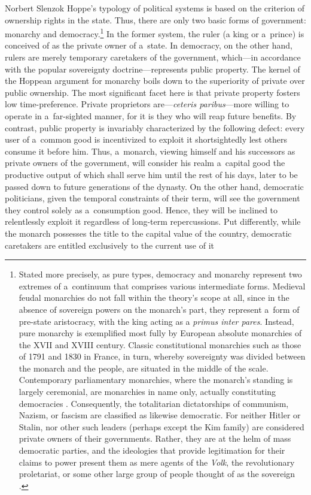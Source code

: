 \begin{artengenv}{Norbert Slenzok}
Hoppe's typology of political systems is based on the criterion of ownership rights in the state. Thus, there are only two basic forms of government: monarchy and democracy.\footnote{Stated more precisely, as pure types, democracy and monarchy represent two extremes of a~continuum that comprises various intermediate forms. Medieval feudal monarchies do not fall within the theory's scope at all, since in the absence of sovereign powers on the monarch's part, they represent a~form of pre-state aristocracy, with the king acting as a \textit{primus inter pares}. Instead, pure monarchy is exemplified most fully by European absolute monarchies of the XVII and XVIII century. Classic constitutional monarchies such as those of 1791 and 1830 in France, in turn, whereby sovereignty was divided between the monarch and the people, are situated in the middle of the scale. Contemporary parliamentary monarchies, where the monarch's standing is largely ceremonial, are monarchies in name only, actually constituting democracies 
\parencites[][f.19]{hoppe_democracy_2007}[][pp.108–112]{hoppe_short_2015}. %
 Consequently, the totalitarian dictatorships of communism, Nazism, or fascism are classified as likewise democratic. For neither Hitler or Stalin, nor other such leaders (perhaps except the Kim family) are considered private owners of their governments. Rather, they are at the helm of mass democratic parties, and the ideologies that provide legitimation for their claims to power present them as mere agents of the \textit{Volk}, the revolutionary proletariat, or some other large group of people thought of as the sovereign 
\parencite[][p.179]{hoppe_eigentum_1987}. %
 } In the former system, the ruler (a king or a~prince) is conceived of as the private owner of a~state. In democracy, on the other hand, rulers are merely temporary caretakers of the government, which---in accordance with the popular sovereignty doctrine---represents public property. The kernel of the Hoppean argument for monarchy boils down to the superiority of private over public ownership. The most significant facet here is that private property fosters low time-preference. Private proprietors are---\textit{ceteris paribus}---more willing to operate in a~far-sighted manner, for it is they who will reap future benefits. By contrast, public property is invariably characterized by the following defect: every user of a~common good is incentivized to exploit it shortsightedly lest others consume it before him. Thus, a~monarch, viewing himself and his successors as private owners of the government, will consider his realm a~capital good the productive output of which shall serve him until the rest of his days, later to be passed down to future generations of the dynasty. On the other hand, democratic politicians, given the temporal constraints of their term, will see the government they control solely as a~consumption good. Hence, they will be inclined to relentlessly exploit it regardless of long-term repercussions. Put differently, while the monarch possesses the title to the capital value of the country, democratic caretakers are entitled exclusively to the current use of it 

\end{artengenv}
